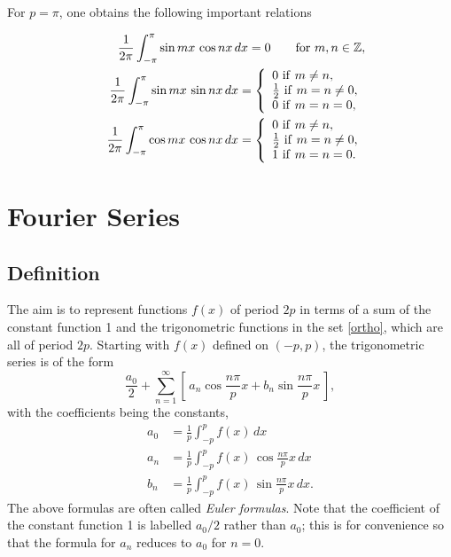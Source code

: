 \documentclass[12pt]{article}
\numberwithin{equation}{section}
\newcommand{\half}{\frac{1}{2}}
\newenvironment{Framed}
  	{\begin{framed}
  		}
  	{\end{framed}}
\begin{document}
For $p=\pi$, one obtains the following important relations
\begin{Framed}
\begin{eqnarray*}
&&\frac{1}{2\pi} \int_{-\pi}^{\pi} \sin mx\,\cos nx \,dx =0\qquad {\rm for}
\,\,m,n \in \mathbb{Z},\\
&&\frac{1}{2\pi} \int_{-\pi}^{\pi} \sin mx\,\sin nx \,dx=\left \{
\begin{array}{l}
0\,\,{\rm if }\,\,m \neq n,\\
\half \,\,{\rm if }\,\,m =n\neq 0,\\
0 \,\,{\rm if }\,\,m =n=0, \end{array} \right.\\
&&\frac{1}{2\pi} \int_{-\pi}^{\pi} \cos mx\,\cos nx \,dx=\left \{
\begin{array}{l}
0\,\,{\rm if }\,\,m \neq n,\\
\half \,\,{\rm if }\,\,m =n\neq 0,\\
1 \,\,{\rm if }\,\,m =n=0. \end{array} \right.
\end{eqnarray*}
\end{Framed}

\section{Fourier Series}
\setcounter{equation}{0}
\subsection{Definition}
The aim is to represent functions $f(x)$ of period $2p$ in terms of a sum of the constant function 1 and the trigonometric functions in the set \eqref{ortho}, which are all of period $2p$. Starting with $f(x)$ defined on $(-p,p)$, the trigonometric series is of the form
\begin{equation} \label{Fourierexp}
\frac{a_0}{2}+\sum_{n=1}^{\infty} [\,a_n\cos \frac{n\pi}{p}x+
b_n\sin \frac{n\pi}{p}x\,],
\end{equation}
with the coefficients being the constants, 
\begin{align}
a_0&=\frac{1}{p}\int_{-p}^p f(x)\,dx\label{a0}\\
a_n&=\frac{1}{p}\int_{-p}^p f(x)\,\cos \frac{n\pi}{p}x\,dx\label{an}\\
b_n&=\frac{1}{p}\int_{-p}^p f(x)\,\sin \frac{n\pi}{p}x\,dx.\label{bn}
\end{align}
The above formulas are often called {\em Euler formulas}.
Note that the coefficient of the constant function 1 is labelled $a_0/2$ rather
than $a_0$; this is for convenience so that the formula for $a_n$ reduces 
to $a_0$ for $n=0$. \\
\end{document}
